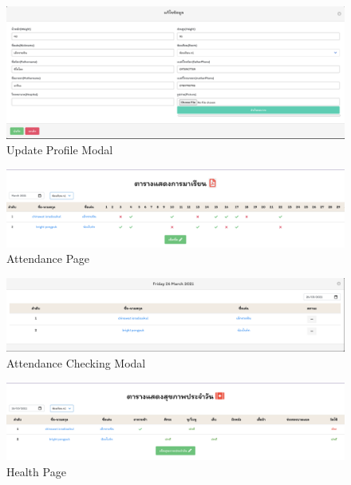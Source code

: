 \begin{figure}
  \begin{center}
  \includegraphics[width=\linewidth]{images/updateProfile.png}
  \end{center}
  \caption[Poem]{Update Profile Modal}
  \label{fig:UpdateProfile}
  \end{figure}
\begin{figure}
  \begin{center}
  \includegraphics[width=\linewidth]{images/Attendance.png}
  \end{center}
  \caption[Poem]{Attendance Page}
  \label{fig:Attendance}
  \end{figure}

\begin{figure}
  \begin{center}
  \includegraphics[width=\linewidth]{images/checkAttendance.png}
  \end{center}
  \caption[Poem]{Attendance Checking Modal}
  \label{fig:CheckAttendance}
  \end{figure}

\begin{figure}
  \begin{center}
  \includegraphics[width=\linewidth]{images/Health.png}
  \end{center}
  \caption[Poem]{Health Page}
  \label{fig:Health}
  \end{figure}


